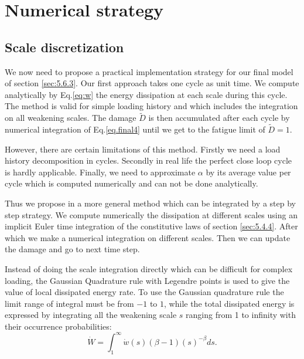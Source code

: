 \newpage
\section{Numerical strategy}
\label{sec:5.7}
\subsection{Scale discretization}
We now need to propose a practical implementation strategy for our final model of section \ref{sec:5.6.3}. Our first approach takes one cycle as unit time. We compute analytically by Eq.\eqref{eq:w} the energy dissipation at each scale during this cycle. The method is valid for simple loading history and which includes the integration on all weakening scales. The damage $\tilde{D}$ is then accumulated after each cycle by numerical integration of Eq.\eqref{eq.final4} until we get to the fatigue limit of $\tilde{D}=1$.

However, there are certain limitations of this method. Firstly we need a load history decomposition in cycles. Secondly in real life the perfect close loop cycle is hardly applicable. Finally, we need to approximate $\alpha$  by its average value per cycle which is computed numerically and can not be done analytically.

Thus we propose in a more general method which can be integrated by a step by step strategy. We compute numerically the dissipation at different scales using an implicit Euler time integration of the constitutive laws of section \ref{sec:5.4.4}. After which we make a numerical integration on different scales. Then we can update the damage and go to next time step. 

Instead of doing the scale integration directly which can be difficult for complex loading, the Gaussian Quadrature rule with Legendre points is used to give the value of local dissipated energy rate. To use the Gaussian quadrature rule the limit range of integral must be from $-1$ to $1$, while the total dissipated energy  is expressed by integrating all the weakening scale $s$ ranging from 1 to infinity with their occurrence probabilities:
$$\dot{W}=\int_{1}^{\infty}\dot{w}(s) (\beta-1)(s)^{-\beta}ds.$$


